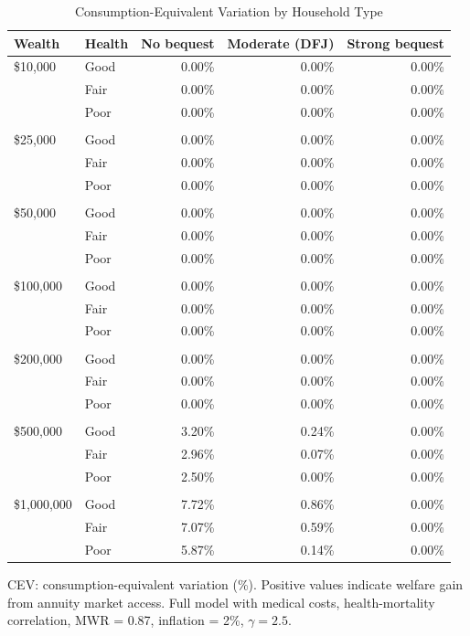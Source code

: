 \begin{table}[htbp]
\centering
\caption{Consumption-Equivalent Variation by Household Type}
\label{tab:cev_grid}
\begin{tabular}{llrrr}
\toprule
Wealth & Health & No bequest & Moderate (DFJ) & Strong bequest \\
\midrule
\$10,000 & Good & 0.00\% & 0.00\% & 0.00\% \\
 & Fair & 0.00\% & 0.00\% & 0.00\% \\
 & Poor & 0.00\% & 0.00\% & 0.00\% \\
\\[3pt]
\$25,000 & Good & 0.00\% & 0.00\% & 0.00\% \\
 & Fair & 0.00\% & 0.00\% & 0.00\% \\
 & Poor & 0.00\% & 0.00\% & 0.00\% \\
\\[3pt]
\$50,000 & Good & 0.00\% & 0.00\% & 0.00\% \\
 & Fair & 0.00\% & 0.00\% & 0.00\% \\
 & Poor & 0.00\% & 0.00\% & 0.00\% \\
\\[3pt]
\$100,000 & Good & 0.00\% & 0.00\% & 0.00\% \\
 & Fair & 0.00\% & 0.00\% & 0.00\% \\
 & Poor & 0.00\% & 0.00\% & 0.00\% \\
\\[3pt]
\$200,000 & Good & 0.00\% & 0.00\% & 0.00\% \\
 & Fair & 0.00\% & 0.00\% & 0.00\% \\
 & Poor & 0.00\% & 0.00\% & 0.00\% \\
\\[3pt]
\$500,000 & Good & 3.20\% & 0.24\% & 0.00\% \\
 & Fair & 2.96\% & 0.07\% & 0.00\% \\
 & Poor & 2.50\% & 0.00\% & 0.00\% \\
\\[3pt]
\$1,000,000 & Good & 7.72\% & 0.86\% & 0.00\% \\
 & Fair & 7.07\% & 0.59\% & 0.00\% \\
 & Poor & 5.87\% & 0.14\% & 0.00\% \\
\bottomrule
\end{tabular}
\begin{tablenotes}
\small
\item CEV: consumption-equivalent variation (\%). Positive values indicate welfare gain from annuity market access. Full model with medical costs, health-mortality correlation, MWR = 0.87, inflation = 2\%, $\gamma = 2.5$.
\end{tablenotes}
\end{table}
